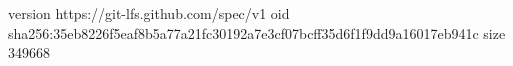 version https://git-lfs.github.com/spec/v1
oid sha256:35eb8226f5eaf8b5a77a21fc30192a7e3cf07bcff35d6f1f9dd9a16017eb941c
size 349668
